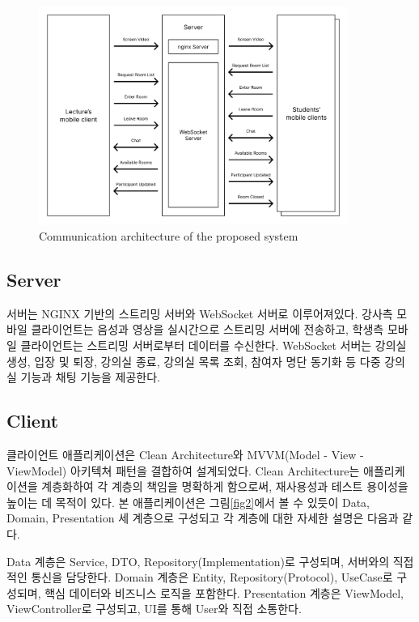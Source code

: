 \documentclass[pdflatex,sn-mathphys-num]{sn-jnl}%
\theoremstyle{thmstyleone}%
\theoremstyle{thmstyletwo}%
\theoremstyle{thmstylethree}%
\begin{document}
\begin{figure}[H]
\centering
\includegraphics[width=0.9\textwidth]{communication_architecture.png}
\caption{Communication architecture of the proposed system}\label{fig1}
\end{figure}

\subsection{Server}\label{subsec1}

서버는 NGINX\cite{NGINX} 기반의 스트리밍 서버와 WebSocket 서버로 이루어져있다. 강사측 모바일 클라이언트는 음성과 영상을 실시간으로 스트리밍 서버에 전송하고, 학생측 모바일 클라이언트는 스트리밍 서버로부터 데이터를 수신한다. WebSocket 서버는 강의실 생성, 입장 및 퇴장, 강의실 종료, 강의실 목록 조회, 참여자 명단 동기화 등 다중 강의실 기능과 채팅 기능을 제공한다.

\subsection{Client}\label{subsec2} 

클라이언트 애플리케이션은 Clean Architecture\cite{martin2017clean}와 MVVM(Model - View - ViewModel) 아키텍쳐 패턴을 결합하여 설계되었다. Clean Architecture는 애플리케이션을 계층화하여 각 계층의 책임을 명확하게 함으로써, 재사용성과 테스트 용이성을 높이는 데 목적이 있다. 본 애플리케이션은 그림\ref{fig2}에서 볼 수 있듯이 Data, Domain, Presentation 세 계층으로 구성되고 각 계층에 대한 자세한 설명은 다음과 같다.

Data 계층은 Service, DTO, Repository(Implementation)로 구성되며, 서버와의 직접적인 통신을 담당한다. Domain 계층은 Entity, Repository(Protocol), UseCase로 구성되며, 핵심 데이터와 비즈니스 로직을 포함한다. Presentation 계층은 ViewModel, ViewController로 구성되고, UI를 통해 User와 직접 소통한다.
\end{document}
